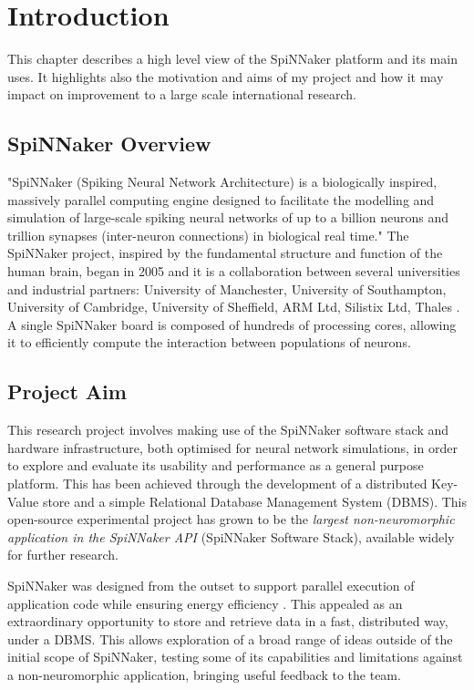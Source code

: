 \chapter{Introduction}
\label{cha:intro}
This chapter describes a high level view of the SpiNNaker platform and its main uses. It highlights also the motivation and aims of my project and how it may impact on improvement to a large scale international research.

\section{SpiNNaker Overview}
\label{sec:overview}
"SpiNNaker (Spiking Neural Network Architecture) is a biologically inspired, massively parallel computing engine designed to facilitate the modelling and simulation of large-scale spiking neural networks of up to a billion neurons and trillion synapses (inter-neuron connections) in biological real time." \cite{painkras} The SpiNNaker project, inspired by the fundamental structure and function of the human brain, began in 2005 and it is a collaboration between several universities and industrial partners: University of Manchester, University of Southampton, University of Cambridge, University of Sheffield, ARM Ltd, Silistix Ltd, Thales \cite{spinnproject}. A single SpiNNaker board is composed of hundreds of processing cores, allowing it to efficiently compute the interaction between populations of neurons.

\section{Project Aim}
\label{sec:aim}
This research project involves making use of the SpiNNaker software stack and hardware infrastructure, both optimised for neural network simulations, in order to explore and evaluate its usability and performance as a general purpose platform. This has been achieved through the development of a distributed Key-Value store and a simple Relational Database Management System (DBMS). This open-source experimental project has grown to be the \textit{largest non-neuromorphic application in the SpiNNaker API} (SpiNNaker Software Stack), available widely for further research.

SpiNNaker was designed from the outset to support parallel execution of application code while ensuring energy efficiency \cite{discrete}. This appealed as an extraordinary opportunity to store and retrieve data in a fast, distributed way, under a DBMS. This allows exploration of a broad range of ideas outside of the initial scope of SpiNNaker, testing some of its capabilities and limitations against a non-neuromorphic application, bringing useful feedback to the team.

